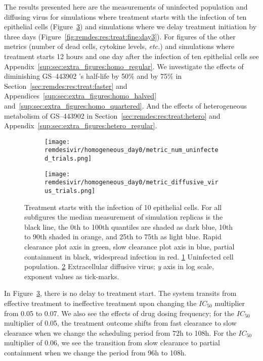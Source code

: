  The results presented here are the measurements of uninfected population and diffusing virus for simulations where treatment starts with the infection of ten epithelial cells (Figure~\ref{fig:remdes:res:treat:fine:day0}) and simulations where we delay treatment initiation by three days (Figure~\ref{fig:remdes:res:treat:fine:day3}). For figures of the other metrics (number of dead cells, cytokine levels, \emph{etc.}) and simulations where treatment starts 12 hours and one day after the infection of ten epithelial cells see Appendix~\ref{sup:sec:extra_figures:homo_regular}. We investigate the effects of diminishing GS--443902 's half-life by 50\% and by 75\% in Section~\ref{sec:remdes:res:treat:faster} and Appendices~\ref{sup:sec:extra_figures:homo_halved} and~\ref{sup:sec:extra_figures:homo_quartered}. And the effects of heterogeneous metabolism of GS--443902 in Section~\ref{sec:remdes:res:treat:hetero} and Appendix~\ref{sup:sec:extra_figures:hetero_regular}.

\begin{figure}[H]
\centering
\begin{subfigure}{0.8\textwidth}
\texttt{[image: remdesivir/homogeneous\_day0/metric\_num\_uninfected\_trials.png]}
\caption{}\label{fig:remdes:res:treat:fine:day0:uninf}
\end{subfigure}
\begin{subfigure}{0.8\textwidth}
\texttt{[image: remdesivir/homogeneous\_day0/metric\_diffusive\_virus\_trials.png]}
\caption{}\label{fig:remdes:res:treat:fine:day0:diff_vir}
\end{subfigure}
\caption{Treatment starts with the infection of 10 epithelial cells. For all subfigures the median measurement of simulation replicas is the black line, the 0th to 100th quantiles are shaded as dark blue, 10th to 90th shaded in orange, and 25th to 75th as light blue. Rapid clearance plot axis in green, slow clearance plot axis in blue, partial containment in black, widespread infection in red.
 \ref{fig:remdes:res:treat:fine:day0:uninf} Uninfected cell population. \ref{fig:remdes:res:treat:fine:day0:diff_vir} Extracellular diffusive virus; \emph{y} axis in log scale, exponent values as tick-marks.}\label{fig:remdes:res:treat:fine:day0}
\end{figure}

In Figure~\ref{fig:remdes:res:treat:fine:day0}, there is no delay to treatment start. The system transits from effective treatment to ineffective treatment upon changing the $IC_{50}$ multiplier from 0.05 to 0.07. We also see the effects of drug dosing frequency; for the $IC_{50}$ multiplier of 0.05, the treatment outcome shifts from fast clearance to slow clearance when we change the scheduling period from 72h to 108h. For the $IC_{50}$ multiplier of 0.06, we see the transition from slow clearance to partial containment when we change the period from 96h to 108h.

